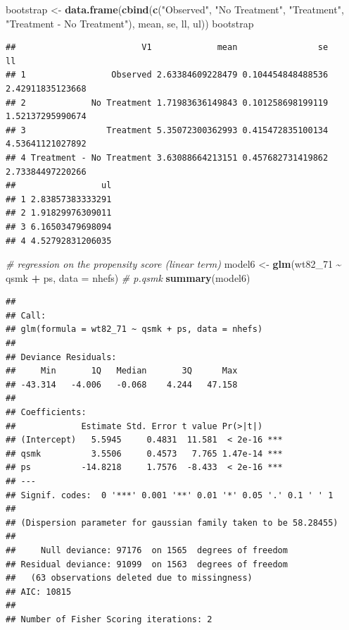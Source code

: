 \documentclass[
  10pt,
]{book}
\newenvironment{Shaded}{\begin{snugshade}}{\end{snugshade}}
\newcommand{\CommentTok}[1]{\textcolor[rgb]{0.56,0.35,0.01}{\textit{#1}}}
\newcommand{\DataTypeTok}[1]{\textcolor[rgb]{0.13,0.29,0.53}{#1}}
\newcommand{\DecValTok}[1]{\textcolor[rgb]{0.00,0.00,0.81}{#1}}
\newcommand{\KeywordTok}[1]{\textcolor[rgb]{0.13,0.29,0.53}{\textbf{#1}}}
\newcommand{\NormalTok}[1]{#1}
\newcommand{\OperatorTok}[1]{\textcolor[rgb]{0.81,0.36,0.00}{\textbf{#1}}}
\newcommand{\StringTok}[1]{\textcolor[rgb]{0.31,0.60,0.02}{#1}}
\begin{document}
\begin{Shaded}
\begin{Highlighting}[]
\NormalTok{bootstrap \textless{}{-}}\StringTok{ }\KeywordTok{data.frame}\NormalTok{(}\KeywordTok{cbind}\NormalTok{(}\KeywordTok{c}\NormalTok{(}\StringTok{"Observed"}\NormalTok{, }\StringTok{"No Treatment"}\NormalTok{, }\StringTok{"Treatment"}\NormalTok{, }
                                \StringTok{"Treatment {-} No Treatment"}\NormalTok{), mean, se, ll, ul))}
\NormalTok{bootstrap}
\end{Highlighting}
\end{Shaded}

\begin{verbatim}
##                         V1             mean                se               ll
## 1                 Observed 2.63384609228479 0.104454848488536 2.42911835123668
## 2             No Treatment 1.71983636149843 0.101258698199119 1.52137295990674
## 3                Treatment 5.35072300362993 0.415472835100134 4.53641121027892
## 4 Treatment - No Treatment 3.63088664213151 0.457682731419862 2.73384497220266
##                 ul
## 1 2.83857383333291
## 2 1.91829976309011
## 3 6.16503479698094
## 4 4.52792831206035
\end{verbatim}

\begin{Shaded}
\begin{Highlighting}[]
\CommentTok{\# regression on the propensity score (linear term)}
\NormalTok{model6 \textless{}{-}}\StringTok{ }\KeywordTok{glm}\NormalTok{(wt82\_}\DecValTok{71} \OperatorTok{\textasciitilde{}}\StringTok{ }\NormalTok{qsmk }\OperatorTok{+}\StringTok{ }\NormalTok{ps, }\DataTypeTok{data =}\NormalTok{ nhefs) }\CommentTok{\# p.qsmk}
\KeywordTok{summary}\NormalTok{(model6)}
\end{Highlighting}
\end{Shaded}

\begin{verbatim}
## 
## Call:
## glm(formula = wt82_71 ~ qsmk + ps, data = nhefs)
## 
## Deviance Residuals: 
##     Min       1Q   Median       3Q      Max  
## -43.314   -4.006   -0.068    4.244   47.158  
## 
## Coefficients:
##             Estimate Std. Error t value Pr(>|t|)    
## (Intercept)   5.5945     0.4831  11.581  < 2e-16 ***
## qsmk          3.5506     0.4573   7.765 1.47e-14 ***
## ps          -14.8218     1.7576  -8.433  < 2e-16 ***
## ---
## Signif. codes:  0 '***' 0.001 '**' 0.01 '*' 0.05 '.' 0.1 ' ' 1
## 
## (Dispersion parameter for gaussian family taken to be 58.28455)
## 
##     Null deviance: 97176  on 1565  degrees of freedom
## Residual deviance: 91099  on 1563  degrees of freedom
##   (63 observations deleted due to missingness)
## AIC: 10815
## 
## Number of Fisher Scoring iterations: 2
\end{verbatim}
\end{document}

